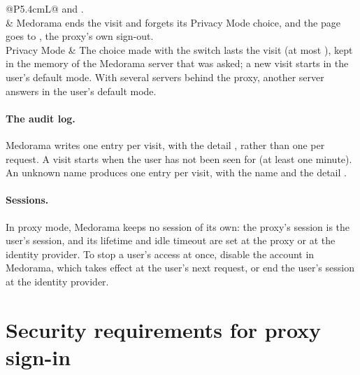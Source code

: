 \begin{xltabular}{\linewidth}{@{}P{5.4cm}L@{}}
   and . \\
 & Medorama ends the visit and forgets its Privacy Mode choice, and the page goes
  to , the proxy's own sign-out. \\
Privacy Mode & The choice made with the switch lasts the visit (at most ),
  kept in the memory of the Medorama server that was asked; a new visit starts in the user's
  default mode. With several servers behind the proxy, another server answers in the user's
  default mode. \\
\end{xltabular}

\paragraph{The audit log.} Medorama writes one  entry per visit, with the detail
, rather than one per request. A visit starts when the user has not been seen for
 (at least one minute). An unknown name produces one
 entry per visit, with the name and the detail .

\paragraph{Sessions.} In proxy mode, Medorama keeps no session of its own: the proxy's session is
the user's session, and its lifetime and idle timeout are set at the proxy or at the identity
provider. To stop a user's access at once, disable the account in Medorama, which takes effect
at the user's next request, or end the user's session at the identity provider.

\section{Security requirements for proxy sign-in}
\label{sec:sign-in-requirements}

